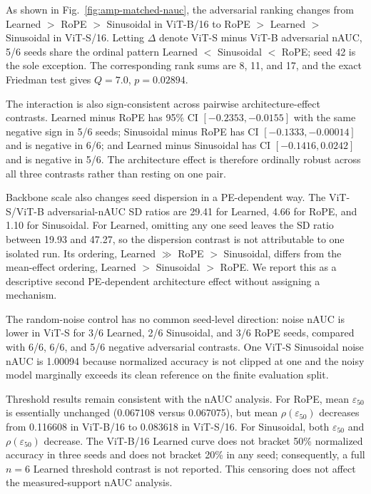 \documentclass[preprint,12pt,authoryear]{elsarticle}
\begin{document}
As shown in Fig.~\ref{fig:amp-matched-nauc}, the adversarial ranking changes from Learned $>$ RoPE $>$ Sinusoidal in
ViT-B/16 to RoPE $>$ Learned $>$ Sinusoidal in ViT-S/16. Letting
$\Delta$ denote ViT-S minus ViT-B adversarial nAUC, 5/6 seeds share the
ordinal pattern Learned $<$ Sinusoidal $<$ RoPE; seed 42 is the sole
exception. The corresponding rank sums are 8, 11, and 17, and the exact
Friedman test gives $Q=7.0$, $p=0.02894$.

The interaction is also sign-consistent across pairwise
architecture-effect contrasts. Learned minus RoPE has 95\% CI
$[-0.2353,-0.0155]$ with the same negative sign in 5/6 seeds;
Sinusoidal minus RoPE has CI $[-0.1333,-0.00014]$ and is negative in 6/6;
and Learned minus Sinusoidal has CI $[-0.1416,0.0242]$ and is negative in
5/6. The architecture effect is therefore ordinally robust across all
three contrasts rather than resting on one pair.

Backbone scale also changes seed dispersion in a PE-dependent way. The
ViT-S/ViT-B adversarial-nAUC SD ratios are 29.41 for Learned, 4.66 for
RoPE, and 1.10 for Sinusoidal. For Learned, omitting any one seed leaves
the SD ratio between 19.93 and 47.27, so the dispersion contrast is not
attributable to one isolated run. Its ordering, Learned $\gg$ RoPE $>$
Sinusoidal, differs from the mean-effect ordering, Learned $>$ Sinusoidal
$>$ RoPE. We report this as a descriptive second PE-dependent architecture
effect without assigning a mechanism.

The random-noise control has no common seed-level direction: noise nAUC
is lower in ViT-S for 3/6 Learned, 2/6 Sinusoidal, and 3/6 RoPE seeds,
compared with 6/6, 6/6, and 5/6 negative adversarial contrasts. One
ViT-S Sinusoidal noise nAUC is 1.00094 because normalized accuracy is not
clipped at one and the noisy model marginally exceeds its clean reference
on the finite evaluation split.

Threshold results remain consistent with the nAUC analysis. For RoPE,
mean $\varepsilon_{50}$ is essentially unchanged (0.067108 versus 0.067075),
but mean $\rho(\varepsilon_{50})$ decreases from 0.116608 in ViT-B/16 to 0.083618 in
ViT-S/16. For Sinusoidal, both $\varepsilon_{50}$ and $\rho(\varepsilon_{50})$ decrease.
The ViT-B/16 Learned curve does not bracket 50\% normalized accuracy in
three seeds and does not bracket 20\% in any seed; consequently, a full
$n=6$ Learned threshold contrast is not reported. This censoring does not
affect the measured-support nAUC analysis.
\end{document}
